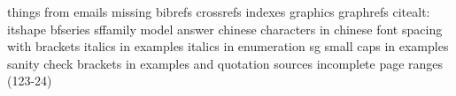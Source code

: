 things from emails
missing bibrefs
crossrefs 
indexes
graphics 
graphrefs
citealt:
itshape
bfseries
sffamily model answer 
chinese characters in chinese font
spacing with brackets
italics in examples
italics in enumeration
sg small caps in examples
sanity check 
brackets in examples and quotation sources
incomplete page ranges (123-24)